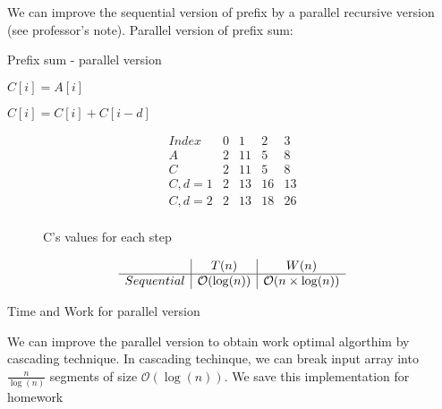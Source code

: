 \documentclass[twoside]{article}
\renewcommand{\O}[1]{$\mathcal{O}(#1)$}
\begin{document}
We can improve the sequential version of prefix by a parallel recursive version (see professor's note). Parallel version of prefix sum:
\begin{algorithm}
\caption{Prefix sum - parallel version}
\begin{algorithmic}[1]
		\State $C[i] = A[i]$
	\EndParFor
	
				\State $C[i] = C[i] + C[i - d]$
			\EndIf
		\EndParFor
	\EndFor
\EndProcedure
\end{algorithmic}
\end{algorithm}
\begin{figure}[H]
\centering

\[
\begin{array}{c|cccc}
Index & 0 & 1 & 2 & 3\\
\hline
A & 2 & 11 & 5 & 8\\
C &  2 & 11 & 5 & 8\\
C, d = 1 & 2 & 13 & 16 & 13\\
C, d = 2 & 2 & 13 & 18 & 26\\
\end{array}
\]
\caption{C's values for each step}
\end{figure}

\begin{table}[ht]
\[
\begin{array}{c|c|c}
 & T(n) & W(n)\\
\hline
Sequential & $\O{\log(n)}$ & $\O{n \times \log(n)}$\\
\end{array}
\]
\caption{Time and Work for parallel version}
\end{table}

We can improve the parallel version to obtain work optimal algorthim by cascading technique. In cascading techinque, we can break input array into $\frac{n}{\log(n)}$ segments of size \O{\log(n)}. We save this implementation for homework
\end{document}
